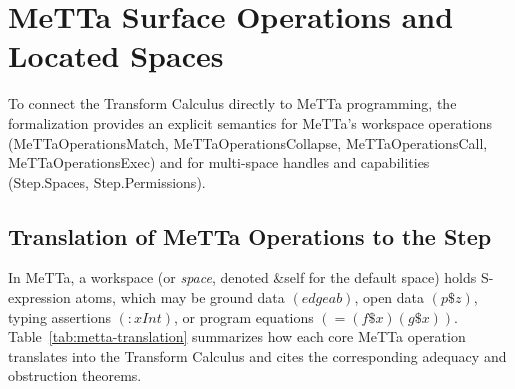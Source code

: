 \documentclass[11pt,a4paper]{article}
\theoremstyle{definition}
\DeclareRobustCommand{\lean}[1]{%
  \ifmmode\text{\normalfont\ttfamily\footnotesize\detokenize{#1}}%
  \else{\normalfont\footnotesize\leanurl{#1}}\fi}
\DeclareRobustCommand{\metta}[1]{\text{\normalfont\ttfamily\footnotesize #1}}
\def\lean#1{#1}%
\def\metta#1{#1}%
\begin{document}
\section{MeTTa Surface Operations and Located Spaces}
\label{sec:metta-ops}

To connect the Transform Calculus directly to MeTTa programming, the formalization provides an explicit semantics for MeTTa's workspace operations (\lean{MeTTaOperationsMatch}, \lean{MeTTaOperationsCollapse}, \lean{MeTTaOperationsCall}, \lean{MeTTaOperationsExec}) and for multi-space handles and capabilities (\lean{Step.Spaces}, \lean{Step.Permissions}).

\subsection{Translation of MeTTa Operations to the Step}

In MeTTa, a workspace (or \emph{space}, denoted \metta{\&self} for the default space) holds S-expression atoms, which may be ground data $\metta{(edge a b)}$, open data $\metta{(p \$z)}$, typing assertions $\metta{(: x Int)}$, or program equations $\metta{(= (f \$x) (g \$x))}$. Table~\ref{tab:metta-translation} summarizes how each core MeTTa operation translates into the Transform Calculus and cites the corresponding adequacy and obstruction theorems.
\end{document}
